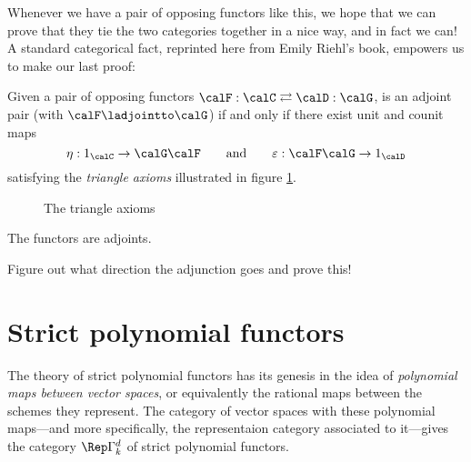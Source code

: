 \documentclass[12pt]{article}
\begin{document}
Whenever we have a pair of opposing functors like this, we hope that we can prove that they 
tie the two categories together in a nice way, and in fact we can! A standard categorical fact,
reprinted here from Emily Riehl's book, empowers us to make our last proof:
\begin{prop}
	Given a pair of opposing functors $\calF:\calC\rightleftarrows\calD:\calG$, is an adjoint pair (with $\calF\ladjointto\calG$) if and only if 
	there exist unit and counit maps
	\[\eta:1_\calC\to \calG\calF\qquad\text{and}\qquad \varepsilon:\calF\calG\to 1_\calD\]
	satisfying the \textit{triangle axioms} illustrated in figure \ref{fig:triangles}.
\end{prop}
\begin{figure}
	\centering
	\qquad
	\caption{The triangle axioms}
	\label{fig:triangles}
\end{figure}

\begin{thm}
	The functors are adjoints.
\end{thm}
{\color{red} Figure out what direction the adjunction goes and prove this!}


\newpage
\section{Strict polynomial functors}
The theory of strict polynomial functors has its genesis in the idea of \textit{polynomial maps between vector spaces},
or equivalently the rational maps between the schemes they represent. The category of vector spaces with these polynomial maps---and 
more specifically, the representaion category associated to it---gives the category $\Rep \Gamma^d_k$ of strict polynomial functors. 
\end{document}
